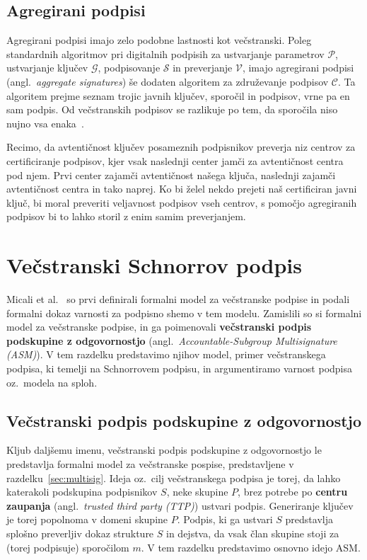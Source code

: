 \documentclass[isrm2, tisk]{fmfdelo}
\begin{document}
\subsection{Agregirani podpisi}
Agregirani podpisi imajo zelo podobne lastnosti kot večstranski. Poleg standardnih algoritmov pri digitalnih
podpisih za ustvarjanje parametrov $\mathcal{P}$, ustvarjanje ključev $\mathcal{G}$, podpisovanje 
$\mathcal{S}$ in preverjanje $\mathcal{V}$, imajo agregirani podpisi (angl.\ \textit{aggregate signatures})
še dodaten algoritem za združevanje podpisov $\mathcal{C}$. Ta algoritem prejme seznam trojic javnih
ključev, sporočil in podpisov, vrne pa en sam podpis. Od večstranskih podpisov se razlikuje po tem,
da sporočila niso nujno vsa enaka~\cite{boneh2011aggregate}.

\begin{primer}
    Recimo, da avtentičnost ključev posameznih podpisnikov preverja niz centrov za certificiranje
    podpisov, kjer vsak naslednji center jamči za avtentičnost centra pod njem. Prvi center zajamči
    avtentičnost našega ključa, naslednji zajamči avtentičnost centra in tako naprej. Ko bi želel
    nekdo prejeti naš certificiran javni ključ, bi moral preveriti veljavnost podpisov vseh centrov,
    s pomočjo agregiranih podpisov bi to lahko storil z enim samim preverjanjem.
\end{primer}

\section{Večstranski Schnorrov podpis}
\label{sec:multischnorr}
Micali et al.~\cite{micali2001asm} so prvi definirali formalni model za večstranske podpise in podali
formalni dokaz varnosti za podpisno shemo v tem modelu. Zamislili so si formalni model za večstranske
podpise, in ga poimenovali \textbf{večstranski podpis podskupine z odgovornostjo} (angl.\
\textit{Accountable-Subgroup Multisignature (ASM)}). V tem razdelku predstavimo njihov model, primer
večstranskega podpisa, ki temelji na Schnorrovem podpisu, in argumentiramo varnost podpisa oz.\
modela na sploh.

\subsection{Večstranski podpis podskupine z odgovornostjo}
Kljub daljšemu imenu, večstranski podpis podskupine z odgovornostjo le predstavlja formalni model za
večstranske pospise, predstavljene v razdelku~\ref{sec:multisig}. Ideja oz.\ cilj večstranskega
podpisa je torej, da lahko katerakoli podskupina podpisnikov $S$, neke skupine $P$, brez potrebe po
\textbf{centru zaupanja} (angl.\ \textit{trusted third party (TTP)}) ustvari podpis. Generiranje
ključev je torej popolnoma v domeni skupine $P$. Podpis, ki ga ustvari $S$ predstavlja splošno
preverljiv dokaz strukture $S$ in dejstva, da vsak član skupine stoji za (torej podpisuje) sporočilom
$m$. V tem razdelku predstavimo osnovno idejo ASM.
\end{document}
